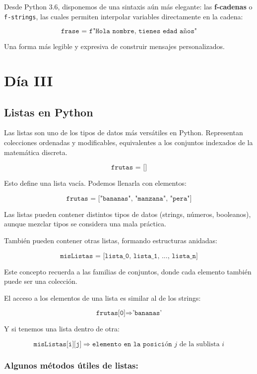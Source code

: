 \documentclass{article}
\theoremstyle{nonumberplain}
\begin{document}
Desde Python 3.6, disponemos de una sintaxis aún más elegante: las \textbf{f-cadenas} o \texttt{f-strings}, las cuales permiten interpolar variables directamente en la cadena:

\[
\texttt{frase = f"Hola {nombre}, tienes {edad} años"}
\]

Una forma más legible y expresiva de construir mensajes personalizados.



\section*{Día III}
\subsection*{Listas en Python}

Las listas son uno de los tipos de datos más versátiles en Python. Representan colecciones ordenadas y modificables, equivalentes a los conjuntos indexados de la matemática discreta.

\[
\texttt{frutas = []}
\]

Esto define una lista vacía. Podemos llenarla con elementos:

\[
\texttt{frutas = ["bananas", "manzana", "pera"]}
\]

Las listas pueden contener distintos tipos de datos (strings, números, booleanos), aunque mezclar tipos se considera una mala práctica.

También pueden contener otras listas, formando estructuras anidadas:

\[
\texttt{misListas = [lista\_0, lista\_1, ..., lista\_n]}
\]

Este concepto recuerda a las familias de conjuntos, donde cada elemento también puede ser una colección.

El acceso a los elementos de una lista es similar al de los strings:

\[
\texttt{frutas[0]} \Rightarrow \texttt{'bananas'}
\]

Y si tenemos una lista dentro de otra:

\[
\texttt{misListas[i][j]} \Rightarrow \texttt{elemento en la posición } j \text{ de la sublista } i
\]



\subsubsection*{Algunos métodos útiles de listas:}
\end{document}
